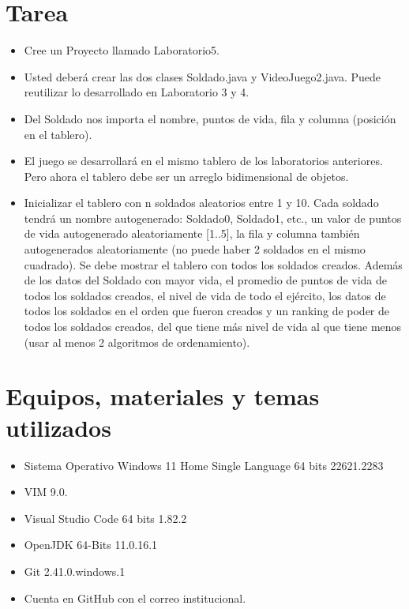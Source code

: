 \documentclass{article}
\begin{document}
	\section{Tarea}
	\begin{itemize}
		\subsection{Videojuego}
			\item Cree un Proyecto llamado Laboratorio5.
			\item Usted deberá crear las dos clases Soldado.java y VideoJuego2.java. Puede reutilizar lo
desarrollado en Laboratorio 3 y 4.
			\item Del Soldado nos importa el nombre, puntos de vida, fila y columna (posición en el tablero).
			\item El juego se desarrollará en el mismo tablero de los laboratorios anteriores. Pero ahora el
tablero debe ser un arreglo bidimensional de objetos.
			\item Inicializar el tablero con n soldados aleatorios entre 1 y 10. Cada soldado tendrá un nombre
autogenerado: Soldado0, Soldado1, etc., un valor de puntos de vida autogenerado
aleatoriamente [1..5], la fila y columna también autogenerados aleatoriamente (no puede
haber 2 soldados en el mismo cuadrado). Se debe mostrar el tablero con todos los soldados
creados. Además de los datos del Soldado con mayor vida,
el promedio de puntos de vida de todos los soldados creados, el nivel de vida de todo el
ejército, los datos de todos los soldados en el orden que fueron creados y un ranking de poder
de todos los soldados creados, del que tiene más nivel de vida al que tiene menos (usar al
menos 2 algoritmos de ordenamiento).
	\end{itemize}
		
	\section{Equipos, materiales y temas utilizados}
	\begin{itemize}
		\item Sistema Operativo Windows 11 Home Single Language 64 bits 22621.2283
		\item VIM 9.0.
		\item Visual Studio Code 64 bits 1.82.2
		\item OpenJDK 64-Bits 11.0.16.1
		\item Git 2.41.0.windows.1
		\item Cuenta en GitHub con el correo institucional. 
	\end{itemize}
	
\end{document}
